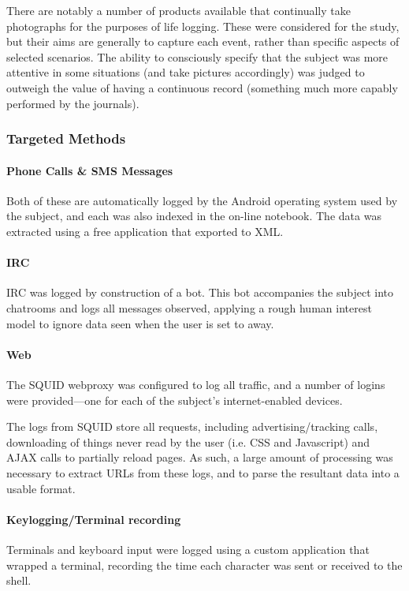 There are notably a number of products available that continually take photographs for the purposes of life logging.  These were considered for the study, but their aims are generally to capture each event, rather than specific aspects of selected scenarios.  The ability to consciously specify that the subject was more attentive in some situations (and take pictures accordingly) was judged to outweigh the value of having a continuous record (something much more capably performed by the journals).




\subsubsection{Targeted Methods}
\paragraph{Phone Calls \& SMS Messages}
Both of these are automatically logged by the Android operating system used by the subject, and each was also indexed in the on-line notebook.  The data was extracted using a free application that exported to XML.


\paragraph{IRC}
IRC was logged by construction of a bot.  This bot accompanies the subject into chatrooms and logs all messages observed, applying a rough human interest model to ignore data seen when the user is set to away.


\paragraph{Web}
The SQUID webproxy was configured to log all traffic, and a number of logins were provided---one for each of the subject's internet-enabled devices.

The logs from SQUID store all requests, including advertising/tracking calls, downloading of things never read by the user (i.e. CSS and Javascript) and AJAX calls to partially reload pages.  As such, a large amount of processing was necessary to extract URLs from these logs, and to parse the resultant data into a usable format.

\paragraph{Keylogging/Terminal recording}
Terminals and keyboard input were logged using a custom application that wrapped a terminal, recording the time each character was sent or received to the shell.

